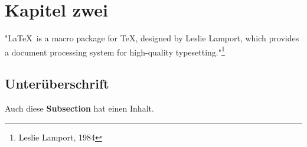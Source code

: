 \section{Kapitel zwei}

"\LaTeX \ is a macro package for TeX, designed by Leslie Lamport, which provides a document processing system for high-quality typesetting."\footnote{Leslie Lamport, 1984}

\subsection{Unterüberschrift}

Auch diese \textbf{Subsection} hat einen Inhalt.
